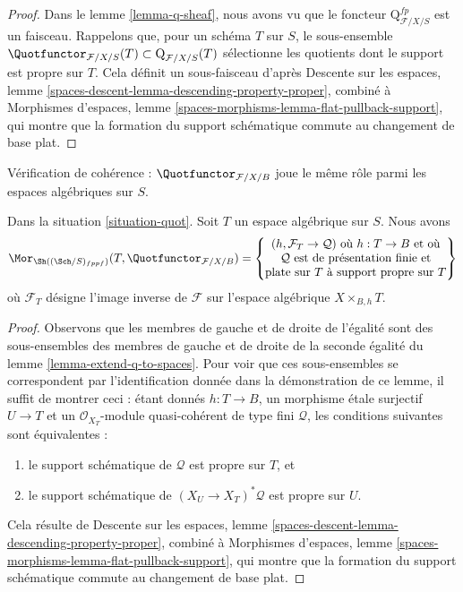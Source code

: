 \begin{proof}
Dans le lemme \ref{lemma-q-sheaf}, nous avons vu que le foncteur
$\text{Q}^{fp}_{\mathcal{F}/X/S}$ est un faisceau. Rappelons que, pour un
schéma $T$ sur $S$, le sous-ensemble
$\Quotfunctor_{\mathcal{F}/X/S}(T) \subset \text{Q}_{\mathcal{F}/X/S}(T)$
sélectionne les quotients dont le support est propre sur $T$. Cela définit un
sous-faisceau d'après Descente sur les espaces, lemme
\ref{spaces-descent-lemma-descending-property-proper}, combiné à Morphismes
d'espaces, lemme \ref{spaces-morphisms-lemma-flat-pullback-support}, qui montre
que la formation du support schématique commute au changement de base plat.
\end{proof}

\noindent
Vérification de cohérence : $\Quotfunctor_{\mathcal{F}/X/B}$ joue le même rôle
parmi les espaces algébriques sur $S$.

\begin{lemma}
\label{lemma-extend-quot-to-spaces}
Dans la situation \ref{situation-quot}. Soit $T$ un espace algébrique sur $S$.
Nous avons
$$
\Mor_{\Sh((\Sch/S)_{fppf})}(T,  \Quotfunctor_{\mathcal{F}/X/B}) =
\left\{
\begin{matrix}
(h, \mathcal{F}_T \to \mathcal{Q}) \text{ où }
h : T \to B \text{ et où}\\
\mathcal{Q}\text{ est de présentation finie et}\\
\text{plate sur }T\text{ à support propre sur }T
\end{matrix}
\right\}
$$
où $\mathcal{F}_T$ désigne l'image inverse de $\mathcal{F}$ sur l'espace
algébrique $X \times_{B, h} T$.
\end{lemma}

\begin{proof}
Observons que les membres de gauche et de droite de l'égalité sont des
sous-ensembles des membres de gauche et de droite de la seconde égalité du
lemme \ref{lemma-extend-q-to-spaces}. Pour voir que ces sous-ensembles se
correspondent par l'identification donnée dans la démonstration de ce lemme, il
suffit de montrer ceci : étant donnés $h : T \to B$, un morphisme \'etale
surjectif $U \to T$ et un $\mathcal{O}_{X_T}$-module quasi-cohérent de type
fini $\mathcal{Q}$, les conditions suivantes sont équivalentes :
\begin{enumerate}
\item le support schématique de $\mathcal{Q}$ est propre sur $T$, et
\item le support schématique de $(X_U \to X_T)^*\mathcal{Q}$ est propre sur
$U$.
\end{enumerate}
Cela résulte de Descente sur les espaces, lemme
\ref{spaces-descent-lemma-descending-property-proper}, combiné à Morphismes
d'espaces, lemme \ref{spaces-morphisms-lemma-flat-pullback-support}, qui montre
que la formation du support schématique commute au changement de base plat.
\end{proof}

